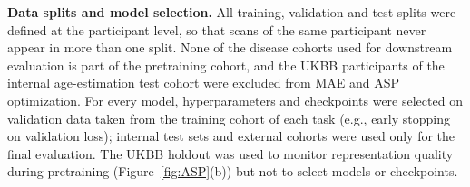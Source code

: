 \documentclass[pdflatex,sn-nature]{sn-jnl}%
\newif\ifhighlight
\newcommand{\rev}[1]{\ifhighlight{\color{blue}{}#1}\else#1\fi}%
\theoremstyle{thmstyleone}%
\theoremstyle{thmstyletwo}%
\theoremstyle{thmstylethree}%
\begin{document}
\rev{\textbf{Data splits and model selection.} All training, validation and test splits were defined at the participant level, so that scans of the same participant never appear in more than one split. None of the disease cohorts used for downstream evaluation is part of the pretraining cohort, and the UKBB participants of the internal age-estimation test cohort were excluded from MAE and ASP optimization. For every model, hyperparameters and checkpoints were selected on validation data taken from the training cohort of each task (e.g., early stopping on validation loss); internal test sets and external cohorts were used only for the final evaluation. The UKBB holdout was used to monitor representation quality during pretraining (Figure~\ref{fig:ASP}(b)) but not to select models or checkpoints.}






\end{document}
